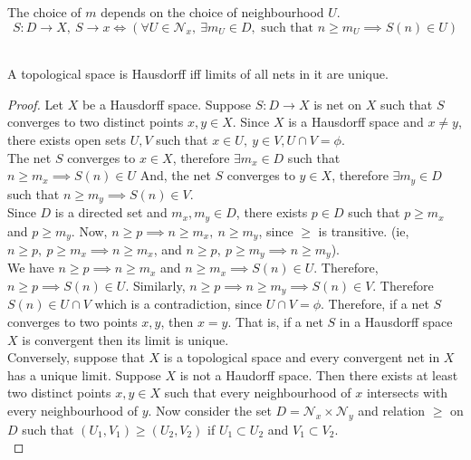 \begin{remark}
\begin{commentary}
	The choice of $m$ depends on the choice of neighbourhood $U$.
	$$S: D \to X,\ S \to x \iff \left( \forall U \in \mathcal{N}_x,\ \exists m_U \in D,\text{ such that } n \ge m_U \implies S(n) \in U \right)$$
\end{commentary}
\end{remark}

\begin{theorem}\cite[10.1.4]{joshi}\\
	A topological space is Hausdorff iff limits of all nets in it are unique.
\end{theorem}
\begin{proof}
	Let $X$ be a  Hausdorff space. Suppose $S : D \to X$ is net on $X$ such that $S$ converges to two distinct points $x,y \in X$.
	Since $X$ is a Hausdorff space and $x \ne y$, there exists open sets $U,V$ such that $x \in U,\ y \in V, U \cap V = \phi$.\\

	The net $S$ converges to $x \in X$, therefore $\exists m_x \in D$ such that $n \ge m_x \implies S(n) \in U$
	And, the net $S$ converges to $y \in X$, therefore $\exists m_y \in D$ such that $n \ge m_y \implies S(n) \in V$.\\

	Since $D$ is a directed set and $m_x, m_y \in D$, there exists $p \in D$ such that $p \ge m_x$ and $p \ge m_y$. Now, $n \ge p \implies n \ge m_x,\ n \ge m_y$, since $\ge$ is transitive. (ie, $n \ge p,\ p \ge m_x \implies n \ge m_x$, and $n \ge p,\ p \ge m_y \implies n \ge m_y$).\\

	We have $n \ge p \implies n \ge m_x$ and $n \ge m_x \implies S(n) \in U$. Therefore, $n \ge p \implies S(n) \in U$. Similarly, $n \ge p \implies n \ge m_y \implies S(n) \in V$. Therefore $S(n) \in U \cap V$ which is a contradiction, since $U \cap V = \phi$. Therefore, if a net $S$ converges to two points $x,y$, then $x = y$. That is, if a net $S$ in a Hausdorff space $X$ is convergent then its limit is unique.\\

	Conversely, suppose that $X$ is a topological space and every convergent net in $X$ has a unique limit. Suppose $X$ is not a Haudorff space. Then there exists at least two distinct points $x,y \in X$ such that every neighbourhood of $x$ intersects with every neighbourhood of $y$. Now consider the set $D = \mathcal{N}_x \times \mathcal{N}_y$ and relation $\ge$ on $D$ such that $(U_1,V_1) \ge (U_2,V_2)$ if $U_1 \subset U_2$ and $V_1 \subset V_2$.\\


\end{proof}
